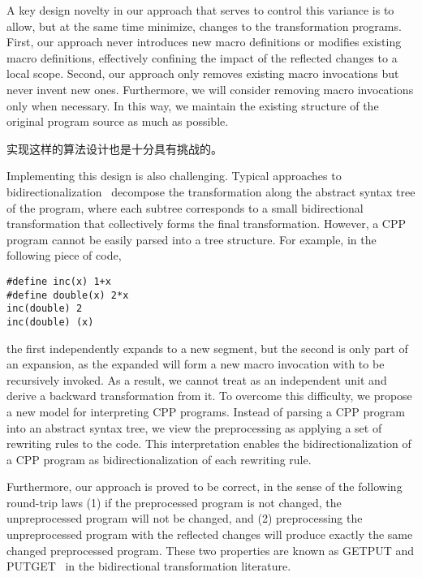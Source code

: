 A key design novelty in our approach that serves to control this variance is to allow, but at the same time minimize, changes to the transformation programs. First, our approach 
never introduces new macro definitions or modifies existing macro definitions, effectively confining the impact of the reflected changes to a local scope.
Second, our approach only removes existing macro invocations but never
invent new ones. %
Furthermore, we will consider removing macro
invocations only when necessary. In this way, we maintain the
existing structure of the original program source as much as possible.

实现这样的算法设计也是十分具有挑战的。


Implementing this design is also challenging. Typical approaches to
bidirectionalization~\parencite{MaHNHT07,Voigtlander09bff,MMHT10} decompose
the transformation along the abstract syntax tree of the program, where
each subtree corresponds to a small bidirectional transformation that
collectively forms the final transformation. However, a CPP program
cannot be easily parsed into a tree structure. For example, in the
following piece of code, 
\begin{lstlisting}
#define inc(x) 1+x
#define double(x) 2*x
inc(double) 2
inc(double) (x)
\end{lstlisting}
the first  independently
expands to a new segment, but the second  is only
part of an expansion, as the expanded  will form a new
macro invocation with  to be recursively invoked. As a
result, we cannot treat  as an independent unit and
derive a backward transformation from it.
To overcome this difficulty, we propose a new model for interpreting
CPP programs. Instead of parsing a CPP program into an abstract syntax
tree, we view the preprocessing as applying a set of rewriting rules
to the code. This interpretation enables the bidirectionalization
of a CPP program   as bidirectionalization of each rewriting rule.

Furthermore, our approach is proved to be correct, in the
sense of the following round-trip laws (1) if the preprocessed program is not changed, the
unpreprocessed program will not be changed, and (2) preprocessing the
unpreprocessed program with the reflected changes will produce exactly the
same changed preprocessed program. These two properties are known as
GETPUT and PUTGET~\parencite{Foster:2007} in the bidirectional transformation literature. 

